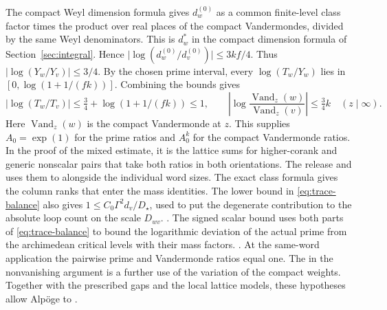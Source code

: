 The compact Weyl dimension formula gives \(d_w^{(0)}\) as a common
finite-level class factor times the product over real places of
the compact Vandermondes, divided by the same Weyl denominators.
This is \(d_w^*\) in the compact dimension formula of
Section~\ref{sec:integral}. Hence
\(\big|\log(d_w^{(0)}/d_v^{(0)})\big|\le3kf/4\).
Thus \(|\log(Y_w/Y_v)|\le3/4\). By the chosen prime interval,
every \(\log(T_w/Y_w)\) lies in \([0,\log(1+1/(fk))]\).
Combining the bounds gives
\begin{equation}
\label{eq:trace-word-ratios}
  |\log(T_w/T_v)|\le \tfrac34+\log(1+1/(fk))\le1,\qquad
  \left|\log\frac{\operatorname{Vand}_{z}(w)}
                   {\operatorname{Vand}_{z}(v)}\right|\le \tfrac34 k
        \quad(z\mid\infty).
\end{equation}
Here \(\operatorname{Vand}_z(w)\) is the compact Vandermonde at \(z\).
This supplies \(A_0=\exp(1)\) for the prime ratios and
\(A_0^k\) for the compact Vandermonde ratios. In the proof of the
mixed estimate, it is the lattice sums for higher-corank and generic
nonscalar pairs that take both ratios in both orientations.
The release 
and uses them to 
alongside the individual word sizes. The exact class formula gives
the column ranks that enter the mass identities. The lower bound in
\eqref{eq:trace-balance} also gives \(1\le C_0\Gamma^2 d_v/D_\star\),
used to put the degenerate contribution to the absolute loop count
on the scale \(D_{wv}\).
.
The signed scalar bound uses both parts of \eqref{eq:trace-balance}
to bound the logarithmic deviation of the actual prime from the
archimedean critical levels with their mass factors.
.
At the same-word application the pairwise prime and Vandermonde
ratios equal one. The
in the nonvanishing argument is a further use of the variation of the
compact weights. Together with the prescribed gaps and the local
lattice models, these hypotheses allow Alp\"oge to
.

